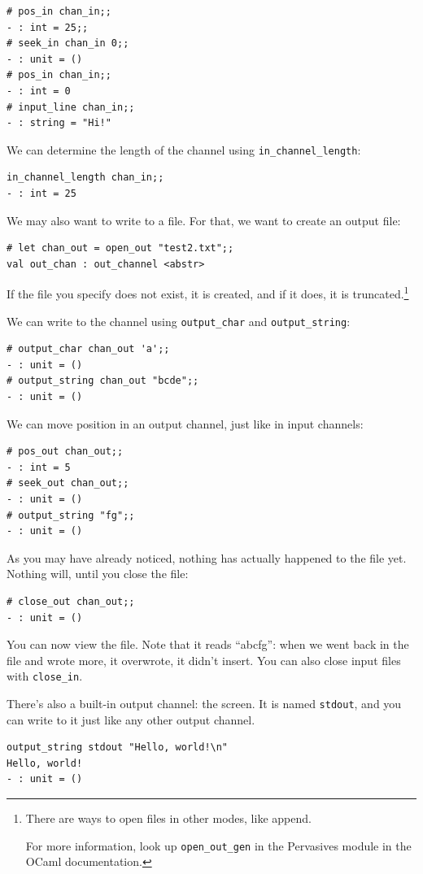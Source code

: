 \documentclass[10pt]{book}
\begin{document}
\beforeverb
\begin{verbatim}
# pos_in chan_in;;
- : int = 25;;
# seek_in chan_in 0;;
- : unit = ()
# pos_in chan_in;;
- : int = 0
# input_line chan_in;;
- : string = "Hi!"
\end{verbatim}
\afterverb
We can determine the length of the channel using \verb"in_channel_length":
\beforeverb
\begin{verbatim}
in_channel_length chan_in;;
- : int = 25
\end{verbatim}
\afterverb

We may also want to write to a file. For that, we want to create an output file:

\beforeverb
\begin{verbatim}
# let chan_out = open_out "test2.txt";;
val out_chan : out_channel <abstr>
\end{verbatim}
\afterverb

If the file you specify does not exist, it is created, and if it does,
it is truncated.\footnote{There are ways to open files in other modes,
  like append. 

For more information, look up {\tt open\_out\_gen} in the
  Pervasives module in the OCaml documentation.}

We can write to the
channel using \verb"output_char" and \verb"output_string": \beforeverb

\begin{verbatim}
# output_char chan_out 'a';;
- : unit = ()
# output_string chan_out "bcde";;
- : unit = ()
\end{verbatim}
\afterverb

We can move position in an output channel, just like in input channels:
\beforeverb
\begin{verbatim}
# pos_out chan_out;;
- : int = 5
# seek_out chan_out;;
- : unit = ()
# output_string "fg";;
- : unit = ()
\end{verbatim}
\afterverb

As you may have already noticed, nothing has actually happened to the file yet. Nothing will, until you close the file:
\beforeverb
\begin{verbatim}
# close_out chan_out;;
- : unit = ()
\end{verbatim}
\afterverb
You can now view the file. Note that it reads ``abcfg'': when we went back in the file and wrote more, it overwrote, it didn't insert. You can also close input files with \verb"close_in".

There's also a built-in output channel: the screen. It is named {\tt stdout}, and you can write to it just like any other output channel.
\beforeverb
\begin{verbatim}
output_string stdout "Hello, world!\n"
Hello, world!
- : unit = ()
\end{verbatim}
\afterverb
\end{document}

